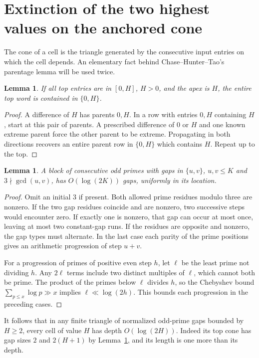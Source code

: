 \documentclass[11pt,a4paper]{article}
\newtheorem{lemma}[theorem]{Lemma}
\begin{document}
\section{Extinction of the two highest values on the anchored cone}
The cone of a cell is the triangle generated by the consecutive input entries on which the cell depends. An elementary fact behind Chase--Hunter--Tao's parentage lemma \cite[Lemma 3.8]{cht} will be used twice.
\begin{lemma}\label{max}
If all top entries are in $[0,H]$, $H>0$, and the apex is $H$, the entire top word is contained in $\{0,H\}$.
\end{lemma}
\begin{proof}
A difference of $H$ has parents $0,H$. In a row with entries $0,H$ containing $H$, start at this pair of parents. A prescribed difference of $0$ or $H$ and one known extreme parent force the other parent to be extreme. Propagating in both directions recovers an entire parent row in $\{0,H\}$ which contains $H$. Repeat up to the top.
\end{proof}
\begin{lemma}\label{mod3}
A block of consecutive odd primes with gaps in $\{u,v\}$, $u,v\le K$ and $3\nmid\gcd(u,v)$, has $O(\log(2K))$ gaps, uniformly in its location.
\end{lemma}
\begin{proof}
Omit an initial $3$ if present. Both allowed prime residues modulo three are nonzero. If the two gap residues coincide and are nonzero, two successive steps would encounter zero. If exactly one is nonzero, that gap can occur at most once, leaving at most two constant-gap runs. If the residues are opposite and nonzero, the gap types must alternate. In the last case each parity of the prime positions gives an arithmetic progression of step $u+v$.

For a progression of primes of positive even step $h$, let $\ell$ be the least prime not dividing $h$. Any $2\ell$ terms include two distinct multiples of $\ell$, which cannot both be prime. The product of the primes below $\ell$ divides $h$, so the Chebyshev bound $\sum_{p\le x}\log p\gg x$ implies $\ell\ll\log(2h)$. This bounds each progression in the preceding cases.
\end{proof}
\noindent
It follows that in any finite triangle of normalized odd-prime gaps bounded by $H\ge2$, every cell of value $H$ has depth $O(\log(2H))$. Indeed its top cone has gap sizes $2$ and $2(H+1)$ by Lemma~\ref{max}, and its length is one more than its depth.
\end{document}
